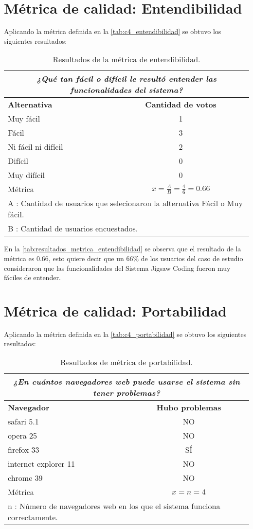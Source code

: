 \section{Métrica de calidad: Entendibilidad}
Aplicando la métrica definida en la \autoref{tab:c4_entendibilidad} se obtuvo los siguientes resultados:

\begin{longtable}{lc}
	\caption{Resultados de la métrica de entendibilidad.}
	\label{tab:resultados_metrica_entendibilidad}\\
	\toprule[0.7mm]
	\multicolumn{2}{c}{\emph{¿Qué tan fácil o difícil le resultó entender las funcionalidades del sistema?}}\\
	\midrule
	\textbf{Alternativa} & \textbf{Cantidad de votos} \\
	\midrule
	Muy fácil & 1 \\
	Fácil & 3 \\
	Ni fácil ni difícil & 2 \\
	Difícil & 0 \\
	Muy difícil & 0 \\
	\midrule
	Métrica & $x = \frac{A}{B} = \frac{4}{6} = 0.66$		\\
	\multicolumn{2}{l}{A : Cantidad de usuarios que selecionaron la alternativa Fácil o Muy fácil.}\\
	\multicolumn{2}{l}{B : Cantidad de usuarios encuestados.}\\
	\bottomrule[0.7mm]
\end{longtable}

En la \autoref{tab:resultados_metrica_entendibilidad} se observa que el resultado de la métrica es 0.66, esto quiere decir que un 66\% de los usuarios del caso de estudio consideraron que las funcionalidades del Sistema Jigsaw Coding fueron muy fáciles de entender.

\section{Métrica de calidad: Portabilidad}
Aplicando la métrica definida en la \autoref{tab:c4_portabilidad} se obtuvo los siguientes resultados:

\begin{longtable}{lc}
	\caption{Resultados de métrica de portabilidad.}
	\label{tab:resultados_metrica_portabilidad}\\
	\toprule[0.7mm]
	\multicolumn{2}{c}{\emph{¿En cuántos navegadores web puede usarse el sistema sin tener problemas?}}\\
	\midrule
	\textbf{Navegador} & \textbf{Hubo problemas} \\
	\midrule
	safari 5.1 &  NO \\
	opera 25 & NO \\
	firefox 33 & SÍ \\
	internet explorer 11 & NO \\
	chrome 39 & NO \\
	\midrule
	Métrica & $x = n = 4$		\\
	\multicolumn{2}{l}{n : Número de navegadores web en los que el sistema funciona correctamente.}\\
	\bottomrule[0.7mm]
\end{longtable}

